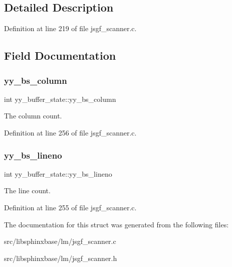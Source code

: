 \subsection{Detailed Description}


Definition at line 219 of file jsgf\+\_\+scanner.\+c.



\subsection{Field Documentation}
\mbox{\label{structyy__buffer__state_a10c4fcd8be759e6bf11e6d3e8cdb0307}} 
\subsubsection{yy\+\_\+bs\+\_\+column}
{\footnotesize\ttfamily int yy\+\_\+buffer\+\_\+state\+::yy\+\_\+bs\+\_\+column}



The column count. 



Definition at line 256 of file jsgf\+\_\+scanner.\+c.

\mbox{\label{structyy__buffer__state_a818e94bc9c766e683c60df1e9fd01199}} 
\subsubsection{yy\+\_\+bs\+\_\+lineno}
{\footnotesize\ttfamily int yy\+\_\+buffer\+\_\+state\+::yy\+\_\+bs\+\_\+lineno}



The line count. 



Definition at line 255 of file jsgf\+\_\+scanner.\+c.



The documentation for this struct was generated from the following files\+:\begin{DoxyCompactItemize}
\item 
src/libsphinxbase/lm/jsgf\+\_\+scanner.\+c\item 
src/libsphinxbase/lm/jsgf\+\_\+scanner.\+h\end{DoxyCompactItemize}
